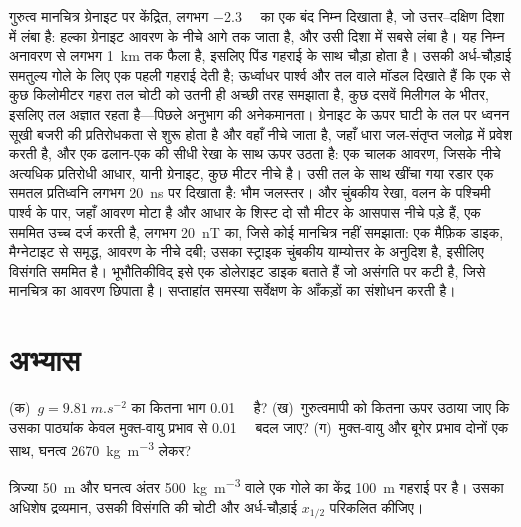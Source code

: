 \begin{example}[वार्डन सर्वेक्षण]\label{ex:b3:field-lab-methods-3:varden}
गुरुत्व मानचित्र ग्रेनाइट पर केंद्रित, लगभग \qty{-2.3}{\milli\gal} का एक बंद निम्न दिखाता है,
जो उत्तर--दक्षिण दिशा में लंबा है: हल्का ग्रेनाइट आवरण के नीचे आगे तक जाता है,
और उसी दिशा में सबसे लंबा है। यह निम्न
अनावरण से लगभग \qty{1}{km} तक फैला है, इसलिए पिंड गहराई के साथ चौड़ा होता है।
उसकी अर्ध-चौड़ाई समतुल्य गोले के लिए एक पहली गहराई देती है;
ऊर्ध्वाधर पार्श्व और तल वाले मॉडल दिखाते हैं कि एक से
कुछ किलोमीटर गहरा तल चोटी को उतनी ही अच्छी तरह समझाता है,
कुछ दसवें मिलीगल के भीतर, इसलिए तल अज्ञात रहता है---पिछले अनुभाग की अनेकमानता।
ग्रेनाइट के ऊपर घाटी के तल पर ध्वनन
सूखी बजरी की प्रतिरोधकता से शुरू होता है और वहाँ नीचे जाता है,
जहाँ धारा जल-संतृप्त जलोढ़ में प्रवेश करती है, और एक ढलान-एक की सीधी रेखा के साथ ऊपर उठता है:
एक चालक आवरण, जिसके नीचे अत्यधिक प्रतिरोधी आधार, यानी
ग्रेनाइट, कुछ मीटर नीचे है। उसी तल के साथ खींचा गया रडार
एक समतल प्रतिध्वनि लगभग \qty{20}{ns} पर दिखाता है: भौम जलस्तर। और चुंबकीय रेखा,
वलन के पश्चिमी पार्श्व के पार, जहाँ आवरण मोटा है और
आधार के शिस्ट दो सौ मीटर के आसपास नीचे पड़े हैं, एक सममित उच्च दर्ज करती है,
लगभग \qty{20}{nT} का, जिसे कोई मानचित्र नहीं समझाता: एक मैफ़िक डाइक,
मैग्नेटाइट से समृद्ध, आवरण के नीचे दबी; उसका स्ट्राइक
चुंबकीय याम्योत्तर के अनुदिश है, इसीलिए विसंगति सममित है। भूभौतिकीविद्
इसे एक डोलेराइट डाइक बताते हैं जो असंगति पर कटी है, जिसे मानचित्र का
आवरण छिपाता है। सप्ताहांत समस्या
सर्वेक्षण के आँकड़ों का संशोधन करती है।
\end{example}

\section{अभ्यास}

\begin{exercise}[$\star$]\label{exo:b3:field-lab-methods-3:1}
(क)~$g = \qty{9.81}{m.s^{-2}}$ का कितना भाग \qty{0.01}{\milli\gal} है?
(ख)~गुरुत्वमापी को कितना ऊपर उठाया जाए कि उसका पाठ्यांक
केवल मुक्त-वायु प्रभाव से \qty{0.01}{\milli\gal} बदल जाए? (ग)~मुक्त-वायु
और बूगेर प्रभाव दोनों एक साथ, घनत्व
\qty{2670}{kg.m^{-3}} लेकर?
\end{exercise}

\begin{exercise}[$\star$]\label{exo:b3:field-lab-methods-3:2}
त्रिज्या \qty{50}{m} और घनत्व अंतर
\qty{+500}{kg.m^{-3}} वाले एक गोले का केंद्र \qty{100}{m} गहराई पर है। उसका
अधिशेष द्रव्यमान, उसकी विसंगति की चोटी और अर्ध-चौड़ाई $x_{1/2}$ परिकलित कीजिए।
\end{exercise}

